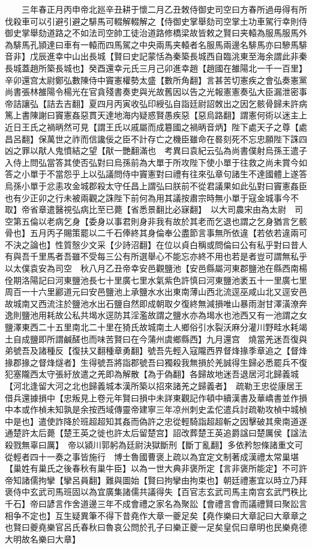 　　三年春正月丙申帝北廵辛丑耕于懷二月乙丑敇侍御史司空曰方春所過毋得有所伐殺車可以引避引避之騑馬可輟解輟解之【侍御史掌舉劾司空掌土功車駕行幸則侍御史掌舉劾道路之不如法司空帥工徒治道路修橋梁故皆敕之賢曰夹轅為服馬服馬外為騑馬孔頴達曰車有一轅而四馬駕之中央兩馬夹轅者名服馬兩邊名騑馬亦曰驂馬騑音非】戊辰進幸中山出長城【賢曰史記蒙恬為秦築長城西自臨洮東至海余謂此非秦長城蓋趙所築長城也】癸酉還幸元氏三月己卯進幸趙【趙國在雒陽北一千一百里】辛卯還宫太尉鄭弘數陳侍中竇憲權勢太盛【數所角翻】言甚苦切憲疾之會弘奏憲黨尚書張林雒陽令楊光在官貪殘書奏吏與光故舊因以告之光報憲憲奏弘大臣漏泄密事帝詰讓弘【詰去吉翻】夏四月丙寅收弘印綬弘自詣廷尉詔敇出之因乞骸骨歸未許病篤上書陳謝曰竇憲姦惡貫天達地海内疑惑賢愚疾惡【惡烏路翻】謂憲何術以迷主上近日王氏之禍昞然可見【謂王氏以戚屬而成簒國之禍昞音炳】陛下處天子之尊【處昌呂翻】保萬世之祚而信讒佞之臣不計存亡之機臣雖命在晷刻死不忘忠願陛下誅四凶之罪以猒人鬼憤結之望【猒一艷翻滿也　考異曰袁紀云弘為尚書僕射烏孫王遣子入侍上問弘當答其使否弘對曰烏孫前為大單于所攻陛下使小單于往救之尚未賞今如答之小單于不當怨乎上以弘議問侍中竇憲對曰禮有往來弘章句諸生不達國體上遂答烏孫小單于忿恚攻金城郡殺太守任昌上謂弘曰朕前不從君議果如此弘對曰竇憲姦臣也有少正卯之行未被兩觀之誅陛下前何為用其議按肅宗時無小單于寇金城事今不取】帝省章遣醫視弘病比至已薨【省悉景翻比必寐翻】　以大司農宋由為太尉　司空第五倫以老病乞身【委身以事君則身非我有故於其老而乞退也謂之乞身猶言乞骸骨也】五月丙子賜策罷以二千石俸終其身倫奉公盡節言事無所依違【若依若違兩可不決之論也】性質慤少文采【少詩沼翻】在位以貞白稱或問倫曰公有私乎對曰昔人有與吾千里馬者吾雖不受每三公有所選舉心不能忘亦終不用也若是者豈可謂無私乎　以太僕袁安為司空　秋八月乙丑帝幸安邑觀鹽池【安邑縣屬河東郡鹽池在縣西南楊佺期洛陽記曰河東鹽池長七十里廣七里水氣紫色許慎曰河東鹽池袤五十一里廣七里周百一十六里酈道元曰安邑鹽池上承鹽水水出東南薄山西北流逕巫咸山北又逕安邑故城南又西流注於鹽池水出石鹽自然即成朝取夕復終無減損唯山暴雨澍甘澤潢潦奔逸則鹽池用耗故公私共堨水逕防其淫濫故謂之鹽水亦為堨水也池西又有一池謂之女鹽澤東西二十五里南北二十里在猗氏故城南土人鄉俗引水裂沃麻分灌川野畦水耗竭土自成鹽即所謂鹹醝也而味苦賢曰在今蒲州虞鄉縣西】九月還宫　燒當羌迷吾復與弟號吾及諸種反【復扶又翻種章勇翻】號吾先輕入寇隴西界督烽掾季章追之【督烽掾郡掾之督烽燧者】生得號吾將詣郡號吾曰獨殺我無損於羌誠得生歸必悉罷兵不復犯塞隴西太守張紆放遣之羌即為解散【為于偽翻】各歸故地迷吾退居河北歸義城【河北逢留大河之北也歸義城本漢所築以招來諸羌之歸義者】　疏勒王忠從康居王借兵還據損中【忠叛見上卷元年賢曰損中未詳東觀記作頓中續漢書及華嶠書並作損中本或作楨未知孰是余按西域傳靈帝建寧三年凉州刺史孟佗遣兵討疏勒攻楨中城楨中是也】遣使詐降於班超超知其姦而偽許之忠從輕騎詣超超斬之因擊破其衆南道遂通楚許太后薨【楚王英之徙也許太后留楚宫】詔改葬楚王英追爵諡曰楚厲侯【諡法殺戮無辜曰厲】　帝以潁川郭躬為廷尉決獄斷刑【斷丁亂翻】多依矜恕條諸重文可從輕者四十一奏之事皆施行　博士魯國曹褒上疏以為宜定文制著成漢禮太常巢堪【巢姓有巢氏之後春秋有巢牛臣】以為一世大典非褒所定【言非褒所能定】不可許帝知諸儒拘攣【攣呂員翻】難與圖始【賢曰拘攣由拘束也】朝廷禮憲宜以時立乃拜褒侍中玄武司馬班固以為宜廣集諸儒共議得失【百官志玄武司馬主南宫玄武門秩比千石】帝曰諺言作舍道邊三年不成會禮之家名為聚訟【會禮言會而議禮賢曰聚訟言相争不定也】互生疑異筆不得下昔堯作大章一夔足矣【堯作樂曰大章記曰大章章之也賢曰夔堯樂官呂氏春秋曰魯哀公問於孔子曰樂正夔一足矣皇侃曰章明也民樂堯德大明故名樂曰大章】

